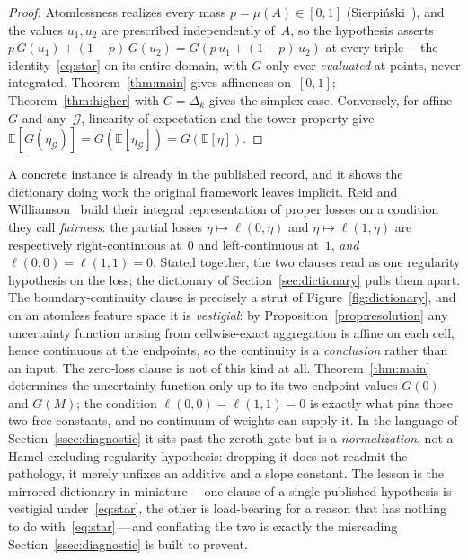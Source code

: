 \documentclass{article}
\theoremstyle{plain}
\theoremstyle{definition}
\newcommand{\E}{\mathbb{E}}
\begin{document}
\begin{proof}
Atomlessness realizes every mass $p=\mu(A)\in[0,1]$
(Sierpi\'nski~\cite{Sierpinski1922}), and the values $u_1,u_2$ are
prescribed independently of~$A$, so the hypothesis asserts
$p\,G(u_1)+(1-p)\,G(u_2)=G(p\,u_1+(1-p)\,u_2)$ at every
triple\,---\,the identity~\eqref{eq:star} on its entire domain, with
$G$ only ever \emph{evaluated} at points, never integrated.
Theorem~\ref{thm:main} gives affineness on~$[0,1]$;
Theorem~\ref{thm:higher} with $C=\Delta_k$ gives the simplex case.
Conversely, for affine~$G$ and any~$\mathcal{G}$, linearity of
expectation and the tower property give
$\E[G(\eta_{\mathcal{G}})]=G(\E[\eta_{\mathcal{G}}])=G(\E[\eta])$.
\end{proof}

A concrete instance is already in the published record, and it shows the
dictionary doing work the original framework leaves implicit. Reid and
Williamson~\cite{ReidWilliamson2011} build their integral representation of
proper losses on a condition they call \emph{fairness}: the partial losses
$\eta\mapsto\ell(0,\eta)$ and $\eta\mapsto\ell(1,\eta)$ are respectively
right-continuous at~$0$ and left-continuous at~$1$, \emph{and}
$\ell(0,0)=\ell(1,1)=0$. Stated together, the two clauses read as one
regularity hypothesis on the loss; the dictionary of
Section~\ref{sec:dictionary} pulls them apart. The boundary-continuity clause
is precisely a strut of Figure~\ref{fig:dictionary}, and on an atomless
feature space it is \emph{vestigial}: by Proposition~\ref{prop:resolution}
any uncertainty function arising from cellwise-exact aggregation is affine on
each cell, hence continuous at the endpoints, so the continuity is a
\emph{conclusion} rather than an input. The zero-loss clause is not of this
kind at all. Theorem~\ref{thm:main} determines the uncertainty function only
up to its two endpoint values $G(0)$ and $G(M)$; the condition
$\ell(0,0)=\ell(1,1)=0$ is exactly what pins those two free constants, and no
continuum of weights can supply it. In the language of
Section~\ref{ssec:diagnostic} it sits past the zeroth gate but is a
\emph{normalization}, not a Hamel-excluding regularity hypothesis: dropping it
does not readmit the pathology, it merely unfixes an additive and a slope
constant. The lesson is the mirrored dictionary in miniature\,---\,one
clause of a single published hypothesis is vestigial under~\eqref{eq:star},
the other is load-bearing for a reason that has nothing to do
with~\eqref{eq:star}\,---\,and conflating the two is exactly the misreading
Section~\ref{ssec:diagnostic} is built to prevent.
\end{document}
